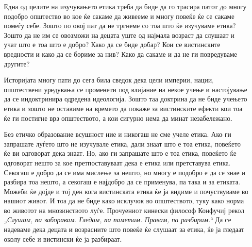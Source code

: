 \documentclass[12pt,a4paper]{article}
\begin{document}
Една од целите на изучувањето етика треба да биде да го трасира патот до многу
подобро општество во кое ќе сакаме да живееме и многу повеќе ќе се сакаме помеѓу
себе. Зошто по овој пат да не тргнеме со тоа што ќе изучуваме етика? Зошто да не
им се овозможи на децата уште од најмала возраст да слушаат и учат што е тоа што
е добро? Како да се биде добар? Кои се вистинските вредности и како да се бориме
за нив? Како да сакаме и да не ги повредуваме другите?

Историјата многу пати до сега била сведок дека цели империи, нации, општествени
уредувања се променети под влијание на некое учење и настојување да се
индоктринира одредена идеологија. Зошто таа доктрина да не биде учењето етика и
зошто не оставиме на времето да покаже за вистинските ефекти кои тоа ќе ги
постигне врз општеството, а кои сигурно нема да минат незабележано.

Без етичко образование всушност ние и никогаш не сме учеле етика. Ако ги
запрашате луѓето што не изучувале етика, дали знаат што е тоа етика, повеќето ќе
ви одговорат дека знаат. Но, ако ги запрашате што е тоа етика, повеќето ќе
одговорат нешто за кое претпоставуваат дека е етика или претставува етика.
Секогаш е добро да се има мислење за нешто, но многу е подобро е да се знае и
разбира тоа нешто, а секогаш е најдобро да се применува, па така и за етиката.
Можеби ќе дојде и тој ден кога вистинската етика ќе ја видиме и почуствуваме во
нашиот живот. И тоа да не биде како исклучок во општеството, туку како норма во
животот на мнозинството луѓе. Прочуениот кинески философ Конфучиј рекол
\emph{„Слушам, па заборавам. Гледам, па паметам. Правам, па разбирам.“} Да се
надеваме дека децата и возрасните што повеќе ќе слушаат за етика, ќе ја гледаат
околу себе и вистински ќе ја разбираат.
\end{document}
